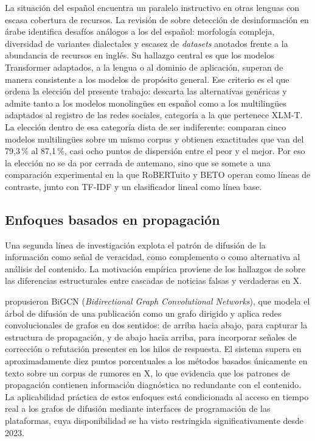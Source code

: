 La situación del español encuentra un paralelo instructivo en otras lenguas con escasa cobertura de recursos. La revisión de \textcite{AlbtoushEtAl2025} sobre detección de desinformación en árabe identifica desafíos análogos a los del español: morfología compleja, diversidad de variantes dialectales y escasez de \textit{datasets} anotados frente a la abundancia de recursos en inglés. Su hallazgo central es que los modelos Transformer adaptados, a la lengua o al dominio de aplicación, superan de manera consistente a los modelos de propósito general. Ese criterio es el que ordena la elección del presente trabajo: descarta las alternativas genéricas y admite tanto a los modelos monolingües en español como a los multilingües adaptados al registro de las redes sociales, categoría a la que pertenece XLM-T. La elección dentro de esa categoría dista de ser indiferente: \textcite{GoulievEtAl2025} comparan cinco modelos multilingües sobre un mismo corpus y obtienen exactitudes que van del 79,3\,\% al 87,1\,\%, casi ocho puntos de dispersión entre el peor y el mejor. Por eso la elección no se da por cerrada de antemano, sino que se somete a una comparación experimental en la que RoBERTuito y BETO operan como líneas de contraste, junto con TF-IDF y un clasificador lineal como línea base.

\subsection{Enfoques basados en propagación}

Una segunda línea de investigación explota el patrón de difusión de la información como señal de veracidad, como complemento o como alternativa al análisis del contenido. La motivación empírica proviene de los hallazgos de \textcite{VosoughiEtAl2018} sobre las diferencias estructurales entre cascadas de noticias falsas y verdaderas en X.

\textcite{BianEtAl2020} propusieron BiGCN (\textit{Bidirectional Graph Convolutional Networks}), que modela el árbol de difusión de una publicación como un grafo dirigido y aplica redes convolucionales de grafos en dos sentidos: de arriba hacia abajo, para capturar la estructura de propagación, y de abajo hacia arriba, para incorporar señales de corrección o refutación presentes en los hilos de respuesta. El sistema supera en aproximadamente diez puntos porcentuales a los métodos basados únicamente en texto sobre un corpus de rumores en X, lo que evidencia que los patrones de propagación contienen información diagnóstica no redundante con el contenido. La aplicabilidad práctica de estos enfoques está condicionada al acceso en tiempo real a los grafos de difusión mediante interfaces de programación de las plataformas, cuya disponibilidad se ha visto restringida significativamente desde 2023.

